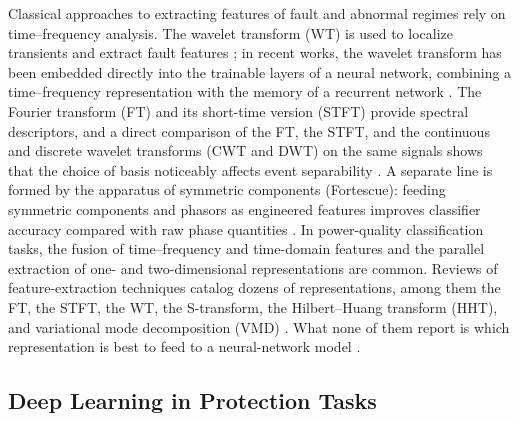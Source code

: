 \documentclass{ieeeojies}
\begin{document}
Classical approaches to extracting features of fault and abnormal regimes rely on time–frequency analysis. The wavelet transform (WT) is used to localize transients and extract fault features \cite{ref6}; in recent works, the wavelet transform has been embedded directly into the trainable layers of a neural network, combining a time–frequency representation with the memory of a recurrent network \cite{ref7}. The Fourier transform (FT) and its short-time version (STFT) provide spectral descriptors, and a direct comparison of the FT, the STFT, and the continuous and discrete wavelet transforms (CWT and DWT) on the same signals shows that the choice of basis noticeably affects event separability \cite{ref5}. A separate line is formed by the apparatus of symmetric components (Fortescue): feeding symmetric components and phasors as engineered features improves classifier accuracy compared with raw phase quantities \cite{ref8}. In power-quality classification tasks, the fusion of time–frequency and time-domain features \cite{ref9, ref11} and the parallel extraction of one- and two-dimensional representations \cite{ref10} are common. Reviews of feature-extraction techniques catalog dozens of representations, among them the FT, the STFT, the WT, the S-transform, the Hilbert–Huang transform (HHT), and variational mode decomposition (VMD) \cite{ref1}. What none of them report is which representation is best to feed to a neural-network model \cite{ref4}.

\subsection{Deep Learning in Protection Tasks}
\end{document}
